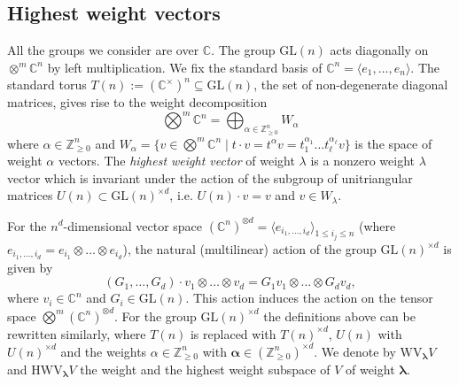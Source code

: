 \documentclass[12pt, reqno]{amsart}
\theoremstyle{definition}
\let\oldbigwedge\bigwedge
\renewcommand{\bigwedge}{
  \mathop{
    \vcenter{
      \hbox{\scalebox{0.9}{$\displaystyle\oldbigwedge$}}
    }
  }
}
\begin{document}
\subsection{Highest weight vectors} 
All the groups we consider are over $\mathbb{C}$.
The group $\mathrm{GL}(n)$ acts diagonally on $\otimes^m \mathbb{C}^n$ by left multiplication. We fix the standard basis of $\mathbb{C}^n = \langle e_1,\ldots,e_n \rangle$. The standard torus $T(n) := (\mathbb{C}^{\times})^{n} \subseteq \mathrm{GL}(n)$, the set of non-degenerate diagonal matrices, gives rise to the weight decomposition
$$
	\bigotimes^m \mathbb{C}^n = \bigoplus_{\alpha \in \mathbb{Z}^{n}_{\ge 0}} W_{\alpha}
$$
where $\alpha \in \mathbb{Z}^{n}_{\ge 0}$ and $W_{\alpha} = \{ v \in \bigotimes^m \mathbb{C}^{n} \mid t \cdot v = t^{\alpha} v = t_{1}^{\alpha_{1}}\ldots t_{\ell}^{\alpha_{\ell}} v\}$ is the space of weight  $\alpha$ vectors. %
The {\it highest weight vector} of weight $\lambda$ is a nonzero weight $\lambda$ vector which is invariant under the action of the subgroup of unitriangular matrices $U(n) \subset \mathrm{GL}(n)^{\times d}$, i.e. $U(n) \cdot v = v$ and $v \in W_{\lambda}$.

For the $n^{d}$-dimensional vector space $(\mathbb{C}^{n})^{\otimes d} = \langle e_{i_1,\ldots,i_d} \rangle_{1 \le i_j\le n}$ (where $e_{i_1,\ldots,i_d} = e_{i_1}\otimes\ldots\otimes e_{i_d}$), the natural (multilinear) action of the group $\mathrm{GL}(n)^{\times d}$ is given by
$$
    (G_1,\ldots,G_d) \cdot v_1 \otimes\ldots\otimes v_d = G_1 v_1 \otimes\ldots\otimes G_d v_d, 
$$
where $v_i \in \mathbb{C}^n$ and $G_i \in \mathrm{GL}(n)$. This action induces the action on the tensor space $\bigotimes^{m} (\mathbb{C}^{n})^{\otimes d}$. 
For the group $\mathrm{GL}(n)^{\times d}$ the definitions above can be rewritten similarly, where $T(n)$ is replaced with $T(n)^{\times d}$, $U(n)$ with $U(n)^{\times d}$ and the weights $\alpha \in \mathbb{Z}^n_{\ge 0}$ with $\pmb{\alpha} \in (\mathbb{Z}^n_{\ge 0})^{\times d}$.
We denote by $\mathrm{WV}_{\pmb{\lambda}} V$ and $\mathrm{HWV}_{\pmb{\lambda}} V$ the weight and the highest weight subspace of $V$ of weight $\pmb{\lambda}$.

\end{document}
